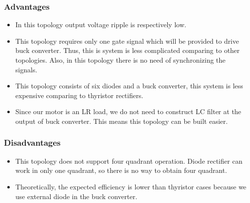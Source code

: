 \subsubsection{Advantages}
\begin{itemize}
    \item In this topology output voltage ripple is respectively low. 
    \item This topology requires only one gate signal which will be provided to drive buck converter. Thus, this is system is less complicated comparing to other topologies. Also, in this topology there is no need of synchronizing the signals.
    \item This topology consists of six diodes and a buck converter, this system is less expensive comparing to thyristor rectifiers.
    \item Since our motor is an LR load, we do not need to construct LC filter at the output of buck converter. This means this topology can be built easier.
\end{itemize}

\subsubsection{Disadvantages}
\begin{itemize}
    \item This topology does not support four quadrant operation. Diode rectifier can work in only one quadrant, so there is no way to obtain four quadrant.
    \item Theoretically, the expected efficiency is lower than thyristor cases because we use external diode in the buck converter.
\end{itemize}